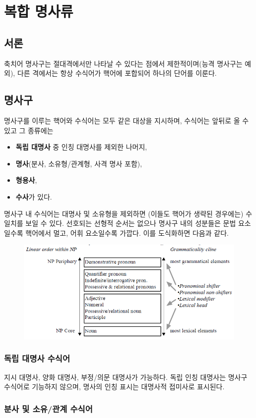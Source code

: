 \section{복합 명사류}
\subsection{서론}
축치어 명사구는 절대격에서만 나타날 수 있다는 점에서 제한적이며(능격 명사구는 예외), 다른 격에서는 항상 수식어가 핵어에 포합되어 하나의 단어를 이룬다.
\subsection{명사구}
명사구를 이루는 핵어와 수식어는 모두 같은 대상을 지시하며, 수식어는 앞뒤로 올 수 있고 그 종류에는 
\begin{itemize}
	\item \textbf{독립 대명사} 중 인칭 대명사를 제외한 나머지,
	\item \textbf{명사}(분사, 소유형/관계형, 사격 명사 포함),
	\item \textbf{형용사},
	\item \textbf{수사}가 있다.
\end{itemize}
명사구 내 수식어는 대명사 및 소유형을 제외하면 (이들도 핵어가 생략된 경우에는) 수 일치를 보일 수 있다. 선호되는 선형적 순서는 없으나 명사구 내의 성분들은 문법 요소일수록 핵어에서 멀고, 어휘 요소일수록 가깝다. 이를 도식화하면 다음과 같다.
\begin{figure}[H]
\centerline{\includegraphics{Chukchi/src/chnp.png}}
\end{figure}
\subsubsection{독립 대명사 수식어}
지시 대명사, 양화 대명사, 부정/의문 대명사가 가능하다. 독립 인칭 대명사는 명사구 수식어로 기능하지 않으며, 명사의 인칭 표시는 대명사적 접미사로 표시된다.
\subsubsection{분사 및 소유/관계 수식어}
\omission

